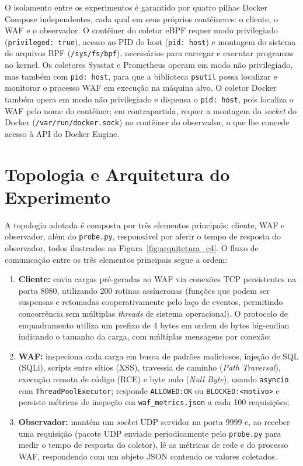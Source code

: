 O isolamento entre os experimentos é garantido por quatro pilhas Docker Compose independentes, cada qual em seus próprios contêineres: o cliente, o WAF e o observador. O contêiner do coletor eBPF requer modo privilegiado (\texttt{privileged: true}), acesso ao PID do host (\texttt{pid: host}) e montagem do sistema de arquivos BPF (\texttt{/sys/fs/bpf}), necessários para carregar e executar programas no kernel. Os coletores Sysstat e Prometheus operam em modo não privilegiado, mas também com \texttt{pid: host}, para que a biblioteca \texttt{psutil} possa localizar e monitorar o processo WAF em execução na máquina alvo. O coletor Docker também opera em modo não privilegiado e dispensa o \texttt{pid: host}, pois localiza o WAF pelo nome do contêiner; em contrapartida, requer a montagem do \textit{socket} do Docker (\texttt{/var/run/docker.sock}) no contêiner do observador, o que lhe concede acesso à API do Docker Engine.

\section{Topologia e Arquitetura do Experimento}

A topologia adotada é composta por três elementos principais: cliente, WAF e observador, além do \texttt{probe.py}, responsável por aferir o tempo de resposta do observador, todos ilustrados na Figura~\ref{fig:arquitetura_c4}. O fluxo de comunicação entre os três elementos principais segue a ordem:

\begin{enumerate}
    \item \textbf{Cliente:} envia cargas pré-geradas ao WAF via conexões TCP persistentes na porta 8080, utilizando 200 rotinas assíncronas (funções que podem ser suspensas e retomadas cooperativamente pelo laço de eventos, permitindo concorrência sem múltiplas \textit{threads} de sistema operacional). O protocolo de enquadramento utiliza um prefixo de 4 bytes em ordem de bytes big-endian indicando o tamanho da carga, com múltiplas mensagens por conexão;
    \item \textbf{WAF:} inspeciona cada carga em busca de padrões maliciosos, injeção de SQL (SQLi), scripts entre sítios (XSS), travessia de caminho (\textit{Path Traversal}), execução remota de código (RCE) e byte nulo (\textit{Null Byte}), usando \texttt{asyncio} com \texttt{Thread\-Pool\-Executor}; responde \texttt{ALLOWED:OK} ou \texttt{BLOCKED:\-<mo\-ti\-vo>} e persiste métricas de inspeção em \texttt{waf\_met\-rics.\-json} a cada 100 requisições;
    \item \textbf{Observador:} mantém um \textit{socket} UDP servidor na porta 9999 e, ao receber uma requisição (pacote UDP enviado periodicamente pelo \texttt{probe.py} para medir o tempo de resposta do coletor), lê as métricas de rede e do processo WAF, respondendo com um objeto JSON contendo os valores coletados.
\end{enumerate}

